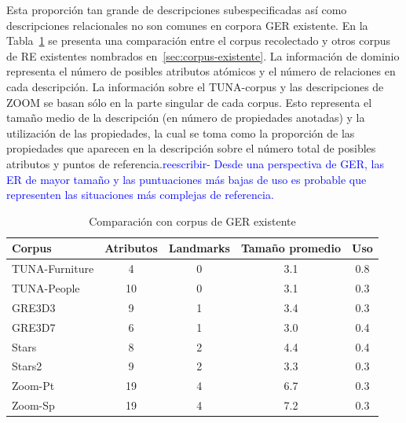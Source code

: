 Esta proporci\'on tan grande de descripciones subespecificadas as\'{i} como descripciones relacionales no son comunes en corpora GER existente. En la Tabla~\ref{tab-comparison} se presenta una comparaci\'on entre el corpus recolectado y otros corpus de RE existentes nombrados en~\ref{sec:corpus-existente}. La informaci\'on de dominio representa el n\'umero de posibles atributos at\'omicos y el n\'umero de relaciones en cada descripci\'on. La informaci\'on sobre el TUNA-corpus y las descripciones de ZOOM se basan s\'olo en la parte singular de cada corpus. Esto representa el tama\~no medio de la descripci\'on (en n\'umero de propiedades anotadas) y la utilizaci\'on de las propiedades, la cual se toma como la proporci\'on de las propiedades que aparecen en la descripci\'on sobre el n\'umero total de posibles atributos y puntos de referencia.\textcolor{blue}{reescribir- Desde una perspectiva de GER, las ER de mayor tama\~no y las puntuaciones m\'as bajas de uso es probable que representen las situaciones m\'as complejas de referencia.}


\begin{table}[ht]
\begin{center}
\footnotesize{
\caption{Comparaci\'on con corpus de GER existente}
\label{tab-comparison}
\begin{tabular} {  l c c c c}
\hline
Corpus											& Atributos			& Landmarks			& Tama\~{n}o promedio	& Uso \\
\hline
TUNA-Furniture							& 4								& 0							& 3.1				& 0.8   \\
TUNA-People									& 10							& 0							& 3.1				& 0.3   \\
GRE3D3											& 9								& 1							& 3.4				& 0.3   \\
GRE3D7											& 6								& 1							& 3.0				& 0.4   \\
Stars												& 8								& 2							& 4.4				& 0.4   \\
Stars2											& 9								& 2							& 3.3				& 0.3   \\
Zoom-Pt											& 19							& 4							& 6.7				& 0.3   \\
Zoom-Sp											& 19							& 4							& 7.2				& 0.3   \\
\hline
\end{tabular}
}
\end{center}
\end{table}


